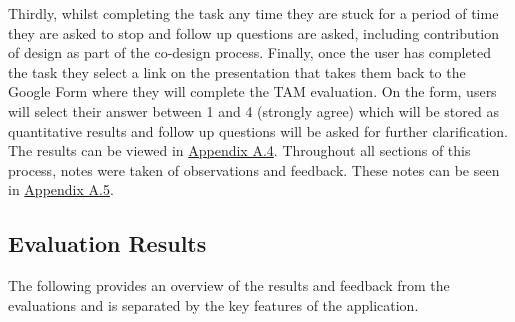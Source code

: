 \documentclass[a4 paper, 12pt]{article}
\begin{document}
Thirdly, whilst completing the task any time they are stuck for a period of time they are asked to stop and follow up questions are asked, including contribution of design as part of the co-design process. Finally, once the user has completed the task they select a link on the presentation that takes them back to the Google Form where they will complete the TAM evaluation. On the form, users will select their answer between 1 and 4 (strongly agree) which will be stored as quantitative results and follow up questions will be asked for further clarification. The results can be viewed in \hyperref[sec:A.4]{Appendix A.4}. Throughout all sections of this process, notes were taken of observations and feedback. These notes can be seen in \hyperref[sec:A.5]{Appendix A.5}.

\subsection{Evaluation Results}
The following provides an overview of the results and feedback from the evaluations and is separated by the key features of the application.
\end{document}
